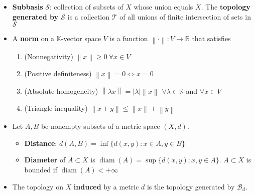 \documentclass[frenchspacing,9pt,landscape,a4paper]{article}
\newcommand{\BR}{\mathbb R}
\newcommand{\abs}[1]{\left\lvert #1 \right\rvert}
\newcommand{\norm}[1]{\left\lVert #1 \right\rVert}
\DeclareMathOperator{\diam}{diam}
\theoremstyle{remark}
\begin{document}
\begin{multicols}{4}
\begin{itemize}
 \item \textbf{Subbasis} $\mathcal{S}$: collection of subsets of  $X$ whose union equals
    $X$. The \textbf{topology generated by $\mathcal{S}$} is a collection $\mathcal{T}$ of all unions of
    finite intersection of sets in  $\mathcal{S}$
\item A \textbf{norm} on a $\mathbb{K}$-vector space  $V$ is a function  $\norm{\cdot}:V\to\BR$ that
    satisfies
     \begin{enumerate}
         \item (Nonnegativity) $\norm{x}\geq 0\ \forall x\in V$ 
         \item (Positive definiteness) $\norm{x}=0\iff x=0$
         \item  (Absolute homogeneity) $\norm{\lambda x}=\abs{\lambda}\norm{x}$
             $\forall\lambda\in\mathbb{K}$ and $\forall x\in V$ 
         \item (Triangle inequality)  $\norm{x+y}\leq\norm{x}+\norm{y}$
    \end{enumerate}
\item Let $A,B$ be nonempty subsets of a metric space  $(X,d)$.
     \begin{itemize}
         \item \textbf{Distance}: $d(A,B)=\inf\{d(x,y):x\in A,y\in B\}$
         \item \textbf{Diameter} of $A\subset X$ is $\diam(A)=\sup\{d(x,y):x,y\in A\}$. $A\subset X$ is bounded if  $\diam(A)<+\infty$
    \end{itemize}
        \item The topology on $X$ \textbf{induced} by a metric  $d$ is the topology generated by
            $\mathcal{B}_d$.

\end{itemize}
\end{multicols}
\end{document}

